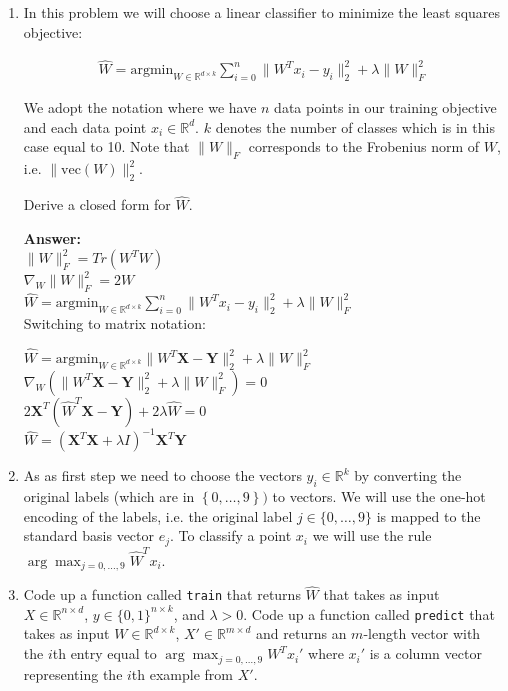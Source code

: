 \documentclass{article}
\newcommand{\1}{\mathbf{1}}
\def\R{\mathbb{R}}
\newcommand{\mb}[1]{\mathbf{#1}}
\begin{document}
\begin{enumerate}
\item In this problem we will choose a linear classifier to minimize the least squares objective:

\begin{align*}\widehat{W} = \text{argmin}_{W \in \R^{d \times k}} \sum_{i=0}^{n} \| W^Tx_{i} - y_{i} \|^{2}_{2} + \lambda \|W\|_{F}^{2}
\end{align*}

We adopt the notation where we have $n$ data points in our training objective 
and each data point $x_i \in \R^d$. $k$ denotes
the number of classes which is in this case equal to 10. Note that $\|W\|_{F}$ corresponds to the Frobenius norm of $W$, i.e. $\|\text{vec}(W)\|_2^2$.

Derive a closed form for $\widehat{W}$.

\textbf{Answer:}\\

$\|W\|_F^2=Tr(W^T W)$\\
$\nabla_W \|W\|_F^2=2 W$\\

$\widehat{W} = \text{argmin}_{W \in \R^{d \times k}} \sum_{i=0}^{n} \| W^Tx_{i} - y_{i} \|^{2}_{2} + \lambda \|W\|_{F}^{2}$\\

Switching to matrix notation:

$\widehat{W} = \text{argmin}_{W \in \R^{d \times k}} \| W^T \mb X- \mb Y \|^{2}_{2} + \lambda \|W\|_{F}^{2}$\\
$\nabla_W (\| W^T \mb X- \mb Y \|^{2}_{2} + \lambda \|W\|_{F}^{2})=0$\\
$2 \mb X^T (\widehat{W}^T \mb X- \mb Y) + 2 \lambda \widehat{W}=0$\\
$\widehat{W}=(\mb X^T \mb X +\lambda I)^{-1} \mb X^T \mb Y$

\item
As as first step we need to choose the vectors $y_i \in \mathbb{R}^k$ by converting the original labels (which are in $\left\{0,\ldots,9\right\})$ to
vectors.
We will use the one-hot encoding of the labels, i.e. the original label $j \in \{0, \ldots, 9\}$ is mapped to the standard basis vector $e_j$.
To classify a point $x_i$ we will use the rule $\arg\max_{j=0,\dots,9} \widehat{W}^T x_i$.\\

\item
Code up a function called \verb|train| that returns $\widehat{W}$ that takes as input $X \in\R^{n \times d}$, $y \in \{0,1\}^{n \times k}$, and $\lambda > 0$.
Code up a function called \verb|predict| that takes as input $W \in \R^{d \times k}$, $X' \in\R^{m \times d}$ and returns an $m$-length vector with the $i$th entry equal to $\arg\max_{j=0,\dots,9} W^T x_i'$ where $x_i'$ is a column vector representing the $i$th example from $X'$.\\


\end{enumerate}
\end{document}
